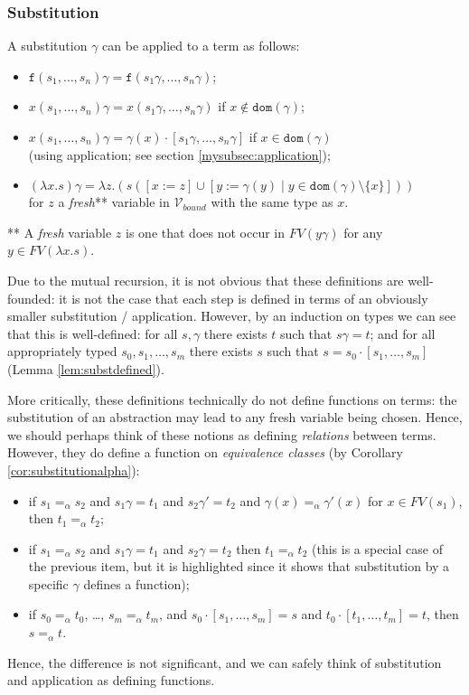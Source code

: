 \documentclass{lmcs}
\theoremstyle{theorem}\newtheorem{theorem}[dummy]{Theorem}
\theoremstyle{theorem}\newtheorem{lemma}[dummy]{Lemma}
\theoremstyle{theorem}\newtheorem{corollary}[dummy]{Corollary}
\theoremstyle{definition}\newtheorem{definition}[dummy]{Definition}
\theoremstyle{definition}\newtheorem{example}[dummy]{Example}
\newcommand{\Vbound}{\mathcal{V}_{\mathit{bound}}}
\newcommand{\FV}{\mathit{FV}}
\newcommand{\domain}{\mathtt{dom}}
\newcommand{\identifier}[1]{\mathtt{#1}}
\newcommand{\afun}{\identifier{f}}
\newcommand{\avar}{x}
\newcommand{\bvar}{y}
\newcommand{\cvar}{z}
\newcommand{\abs}[2]{\lambda #1.#2}
\newcommand{\mysubsection}[1]{\vspace{-12pt}\subsubsection{#1}}
\begin{document}
\mysubsection{Substitution}\label{mysubsec:substitution}
A substitution $\gamma$ can be applied to a term as follows:
\begin{itemize}
\item $\afun(s_1,\dots,s_n)\gamma = \afun(s_1\gamma,\dots,s_n\gamma)$;
\item $\avar(s_1,\dots,s_n)\gamma = \avar(s_1\gamma,\dots,s_n\gamma)$
  if $\avar \notin \domain(\gamma)$;
\item $\avar(s_1,\dots,s_n)\gamma = \gamma(\avar) \cdot [s_1\gamma,\dots,s_n\gamma]$
  if $\avar \in \domain(\gamma)$ \\
  (using application; see section \ref{mysubsec:application});
\item $(\abs{\avar}{s})\gamma = \abs{\cvar}{(s ([\avar:=\cvar] \cup [\bvar := \gamma(\bvar) \mid
  \bvar \in \domain(\gamma) \setminus \{\avar\}])})$ \\
  for $\cvar$ a \emph{fresh}** variable in $\Vbound$ with the same type as $\avar$.
\end{itemize}
** A \emph{fresh} variable $\cvar$ is one that does not occur in $\FV(\bvar\gamma)$ for any
$\bvar \in \FV(\abs{\avar}{s})$.

Due to the mutual recursion, it is not obvious that these definitions are well-founded: it is not
the case that each step is defined in terms of an obviously smaller substitution / application.
However, by an induction on types we can see that this is well-defined: for all $s,\gamma$ there
exists $t$ such that $s\gamma = t$; and for all appropriately typed $s_0,s_1,\dots,s_m$ there
exists $s$ such that $s = s_0 \cdot [s_1,\dots,s_m]$ (Lemma \ref{lem:substdefined}).

More critically, these definitions technically do not define functions on terms: the substitution
of an abstraction may lead to any fresh variable being chosen.  Hence, we should perhaps think of
these notions as defining \emph{relations} between terms.  However, they do define a function on
\emph{equivalence classes} (by Corollary \ref{cor:substitutionalpha}):
\begin{itemize}
\item if $s_1 =_\alpha s_2$ and $s_1\gamma = t_1$ and $s_2\gamma' = t_2$ and $\gamma(x) =_\alpha
  \gamma'(x)$ for $x \in \FV(s_1)$, then $t_1 =_\alpha t_2$;
\item if $s_1 =_\alpha s_2$ and $s_1\gamma = t_1$ and $s_2\gamma = t_2$ then $t_1 =_\alpha t_2$
  (this is a special case of the previous item, but it is highlighted since it shows that
  substitution by a specific $\gamma$ defines a function);
\item if $s_0 =_\alpha t_0$, \dots, $s_m =_\alpha t_m$, and $s_0 \cdot [s_1,\dots,s_m] = s$ and
  $t_0 \cdot [t_1,\dots,t_m] = t$, then $s =_\alpha t$.
\end{itemize}
Hence, the difference is not significant, and we can safely think of substitution and application
as defining functions.
\end{document}
